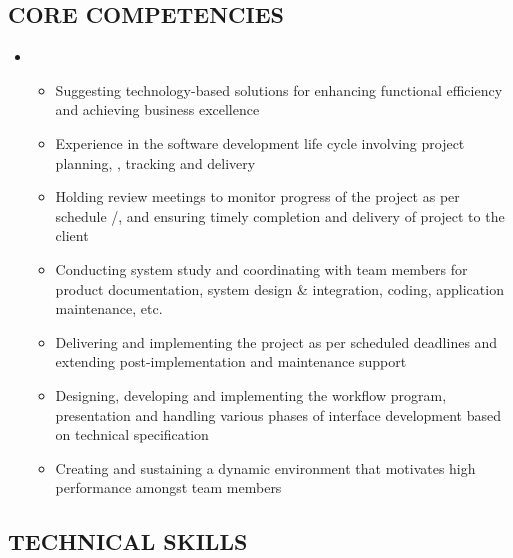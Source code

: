 \documentclass[]{article}
\begin{document}
\subsection{CORE COMPETENCIES}\label{core-competencies}

\begin{itemize}
\item
  \begin{itemize}
  \itemsep1pt\parskip0pt
  \item
    Suggesting technology-based solutions for enhancing functional
    efficiency and achieving business excellence
  \item
    Experience in the software development life cycle involving project
    planning, , tracking and delivery
  \item
    Holding review meetings to monitor progress of the project as per
    schedule /, and ensuring timely completion and delivery of project
    to the client
  \item
    Conducting system study and coordinating with team members for
    product documentation, system design \& integration, coding,
    application maintenance, etc.
  \item
    Delivering and implementing the project as per scheduled deadlines
    and extending post-implementation and maintenance support
  \item
    Designing, developing and implementing the workflow program,
    presentation and handling various phases of interface development
    based on technical specification
  \item
    Creating and sustaining a dynamic environment that motivates high
    performance amongst team members
  \end{itemize}
\end{itemize}

\subsection{TECHNICAL SKILLS}\label{technical-skills}
\end{document}
